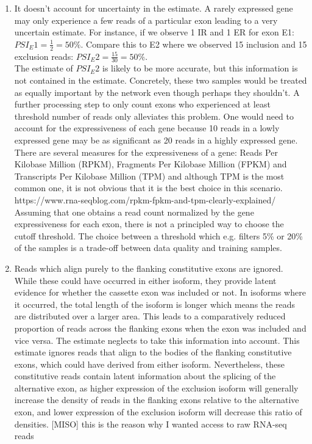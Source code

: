\begin{enumerate}
	\item It doesn't account for uncertainty in the estimate. A rarely expressed gene may only experience a few reads of a particular exon leading to a very uncertain estimate. For instance, if we observe 1 IR and 1 ER for exon E1: $PSI_E1 = \frac{1}{2} = 50\%$. Compare this to E2 where we observed 15 inclusion and 15 exclusion reads: $PSI_E2 = \frac{15}{30} = 50\%$.\\
	The estimate of $PSI_E2$ is likely to be more accurate, but this information is not contained in the estimate. Concretely, these two samples would be treated as equally important by the network even though perhaps they shouldn't.
	A further processing step to only count exons who experienced at least threshold number of reads only alleviates this problem. One would need to account for the expressiveness of each gene because 10 reads in a lowly expressed gene may be as significant as 20 reads in a highly expressed gene. There are several measures for the expressiveness of a gene: Reads Per Kilobase Million (RPKM), Fragments Per Kilobase Million (FPKM) and Transcripts Per Kilobase Million (TPM) and although TPM is the most common one, it is not obvious that it is the best choice in this scenario.
	https://www.rna-seqblog.com/rpkm-fpkm-and-tpm-clearly-explained/
	Assuming that one obtains a read count normalized by the gene expressiveness for each exon, there is not a principled way to choose the cutoff threshold. The choice between a threshold which e.g. filters 5\% or 20\% of the samples is a trade-off between data quality and training samples.
	\item Reads which align purely to the flanking constitutive exons are ignored. While these could have occurred in either isoform, they provide latent evidence for whether the cassette exon was included or not. In isoforms where it occurred, the total length of the isoform is longer which means the reads are distributed over a larger area. This leads to a comparatively reduced proportion of reads across the flanking exons when the exon was included and vice versa. The estimate neglects to take this information into account.
	This estimate ignores reads that align to the bodies of the flanking constitutive exons, which could have derived from either isoform. Nevertheless, these constitutive reads contain latent information about the splicing of the alternative exon, as higher expression of the exclusion isoform will generally increase the density of reads in the flanking exons relative to the alternative exon, and lower expression of the exclusion isoform will decrease this ratio of densities.
	[MISO]
	this is the reason why I wanted access to raw RNA-seq reads
	
\end{enumerate}


